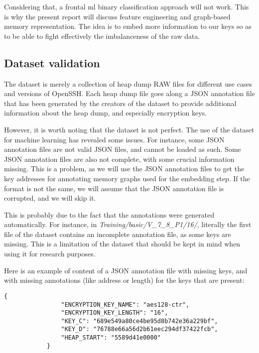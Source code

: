     Considering that, a frontal \acrshort{ml} binary classification approach will not work. This is why the present report will discuss feature engineering and graph-based memory representation. The idea is to embed more information to our keys so as to be able to fight effectively the imbalanceness of the raw data.

    \subsection{Dataset validation}
    The dataset is merely a collection of heap dump RAW files for different use cases and versions of OpenSSH. Each heap dump file goes along a JSON annotation file that has been generated by the creators of the dataset to provide additional information about the heap dump, and especially encryption keys.
    
    However, it is worth noting that the dataset is not perfect. The use of the dataset for machine learning has revealed some issues. For instance, some JSON annotation files are not valid JSON files, and cannot be loaded as such. Some JSON annotation files are also not complete, with some crucial information missing. This is a problem, as we will use the JSON annotation files to get the key addresses for annotating memory graphs used for the embedding step. If the format is not the same, we will assume that the JSON annotation file is corrupted, and we will skip it.
    
    This is probably due to the fact that the annotations were generated automatically. For instance, in \textit{Training/basic/V\_7\_8\_P1/16/}, literally the first file of the dataset contains an incomplete annotation file, as some keys are missing. This is a limitation of the dataset that should be kept in mind when using it for research purposes.

    \begin{minipage}{\dimexpr\linewidth-20pt}
        Here is an example of content of a JSON annotation file with missing keys, and with missing annotations (like address or length) for the keys that are present:

        \begin{lstlisting}[style=json, caption={Missing keys in JSON annotation file \textit{Training/basic/V\_6\_0\_P1/16/24375-1644243522.json}}]
            {
                "ENCRYPTION_KEY_NAME": "aes128-ctr",
                "ENCRYPTION_KEY_LENGTH": "16",
                "KEY_C": "689e549a80ce4be95d8b742e36a229bf",
                "KEY_D": "76788e66a56d2b61eec294df37422fcb",
                "HEAP_START": "5589d41e0000"
            }
        \end{lstlisting}
    \end{minipage}

